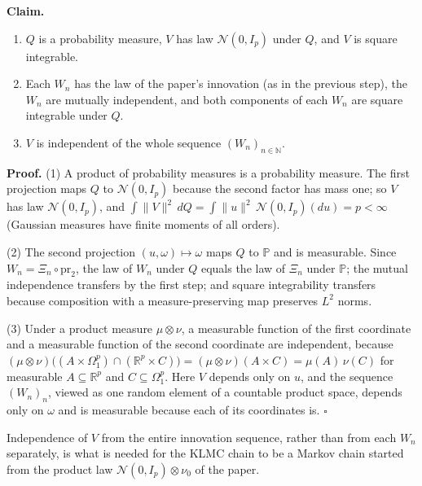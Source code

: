 \documentclass[11pt,a4paper]{article}
\begin{document}
\textbf{Claim.}



\begin{enumerate}


\item \(Q\) is a probability measure, \(V\) has law \(\mathcal N(0,I_p)\) under \(Q\), and \(V\) is square integrable.

\item Each \(W_n\) has the law of the paper's innovation (as in the previous step), the \(W_n\) are mutually independent, and both components of each \(W_n\) are square integrable under \(Q\).

\item \(V\) is independent of the whole sequence \((W_n)_{n\in\mathbb N}\).

\end{enumerate}



\textbf{Proof.} (1) A product of probability measures is a probability measure. The first projection maps \(Q\) to \(\mathcal N(0,I_p)\) because the second factor has mass one; so \(V\) has law \(\mathcal N(0,I_p)\), and \(\int\|V\|^2\,dQ=\int\|u\|^2\,\mathcal N(0,I_p)(du)=p<\infty\) (Gaussian measures have finite moments of all orders).




(2) The second projection \((u,\omega)\mapsto\omega\) maps \(Q\) to \(\mathbb P\) and is measurable. Since \(W_n=\Xi_n\circ\mathrm{pr}_2\), the law of \(W_n\) under \(Q\) equals the law of \(\Xi_n\) under \(\mathbb P\); the mutual independence transfers by the first step; and square integrability transfers because composition with a measure-preserving map preserves \(L^2\) norms.




(3) Under a product measure \(\mu\otimes\nu\), a measurable function of the first coordinate and a measurable function of the second coordinate are independent, because \((\mu\otimes\nu)\bigl((A\times\Omega_1^p)\cap(\mathbb R^p\times C)\bigr)=(\mu\otimes\nu)(A\times C)=\mu(A)\,\nu(C)\) for measurable \(A\subseteq\mathbb R^p\) and \(C\subseteq\Omega_1^p\). Here \(V\) depends only on \(u\), and the sequence \((W_n)_n\), viewed as one random element of a countable product space, depends only on \(\omega\) and is measurable because each of its coordinates is. \(\square\)




Independence of \(V\) from the entire innovation sequence, rather than from each \(W_n\) separately, is what is needed for the KLMC chain to be a Markov chain started from the product law \(\mathcal N(0,I_p)\otimes\nu_0\) of the paper.
\end{document}
